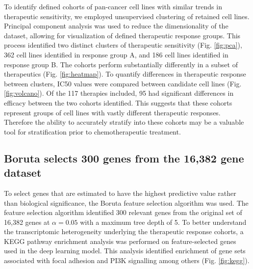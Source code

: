 \documentclass[10pt, letterpaper]{article}
\begin{document}
\begin{multicols*}{2}
To identify defined cohorts of pan-cancer cell lines with similar trends in therapeutic sensitivity, we employed unsupervised clustering of retained cell lines. Principal component analysis was used to reduce the dimensionality of the dataset, allowing for visualization of defined therapeutic response groups. This process identified two distinct clusters of therapeutic sensitivity (Fig. \ref{fig:pca}), 362 cell lines identified in response group A, and 186 cell lines identified in response group B. The cohorts perform substantially differently in a subset of therapeutics (Fig. \ref{fig:heatmap}). To quantify differences in therapeutic response between clusters, IC50 values were compared between candidate cell lines (Fig. \ref{fig:volcano}). Of the 117 therapies included, 95 had significant differences in efficacy between the two cohorts identified. This suggests that these cohorts represent groups of cell lines with vastly different therapeutic responses. Therefore the ability to accurately stratify into these cohorts may be a valuable tool for stratification prior to chemotherapeutic treatment. 


\subsection{Boruta selects 300 genes from the 16,382 gene dataset}
To select genes that are estimated to have the highest predictive value rather than biological significance, the Boruta feature selection algorithm was used. The feature selection algorithm identified 300 relevant genes from the original set of 16,382 genes at $\alpha=0.05$ with a maximum tree depth of 5. To better understand the transcriptomic heterogeneity underlying the therapeutic response cohorts, a KEGG pathway enrichment analysis was performed on feature-selected genes used in the deep learning model. This analysis identified enrichment of gene sets associated with focal adhesion and PI3K signalling among others (Fig. \ref{fig:kegg}).



\end{multicols*}
\end{document}
